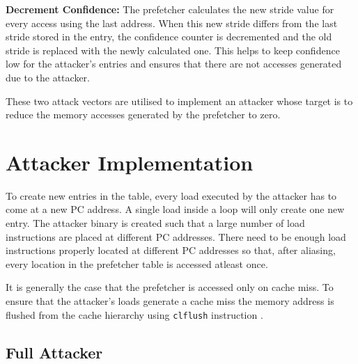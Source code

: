 \documentclass[conference]{IEEEtran}
\begin{document}
\textbf{Decrement Confidence:} The prefetcher calculates the new stride value for
every access using the last address. When this new stride differs from the last stride
stored in the entry, the confidence counter is decremented and the old stride is replaced
with the newly calculated one. This helps to keep confidence low for the attacker's
entries and ensures that there are not accesses generated due to the attacker.

These two attack vectors are utilised to implement an attacker whose target is to
reduce the memory accesses generated by the prefetcher to zero.

\section{Attacker Implementation}

To create new entries in the table, every load executed by the
attacker has to come at a new PC address. A single load inside
a loop will only create one new entry. The attacker binary
is created such that a large number of load instructions
are placed at different PC addresses. There need to be
enough load instructions properly located at different PC addresses
so that, after aliasing, every location in the prefetcher table is accessed
atleast once.

It is generally the case that the prefetcher is accessed only
on cache miss. To ensure that the attacker's loads generate a cache miss
the memory address is flushed from the cache hierarchy using \texttt{clflush}
instruction \cite{intel-x86}.


\subsection{Full Attacker}
\end{document}
